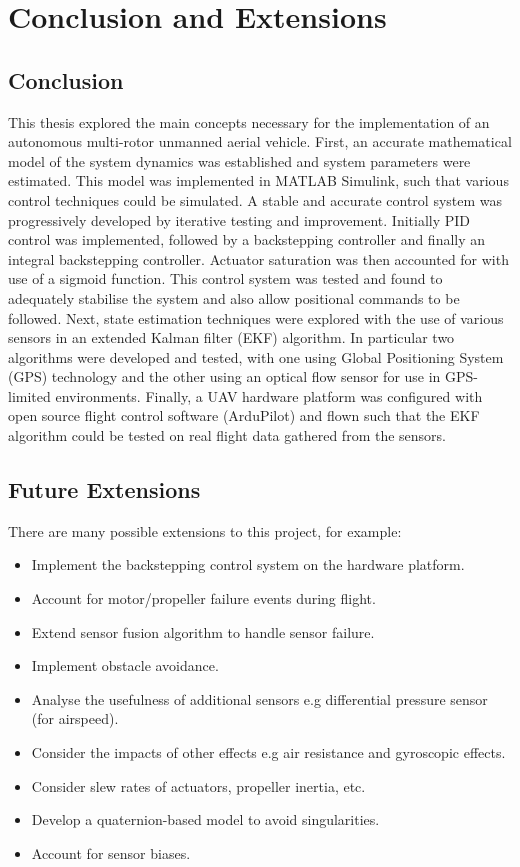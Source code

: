 
\chapter{Conclusion and Extensions}

\section{Conclusion}
This thesis explored the main concepts necessary for the implementation of an autonomous multi-rotor unmanned aerial vehicle. First, an accurate mathematical model of the system dynamics was established and system parameters were estimated. This model was implemented in MATLAB Simulink, such that various control techniques could be simulated. A stable and accurate control system was progressively developed by iterative testing and improvement. Initially PID control was implemented, followed by a backstepping controller and finally an integral backstepping controller. Actuator saturation was then accounted for with use of a sigmoid function. This control system was tested and found to adequately stabilise the system and also allow positional commands to be followed. Next, state estimation techniques were explored with the use of various sensors in an extended Kalman filter (EKF) algorithm. In particular two algorithms were developed and tested, with one using Global Positioning System (GPS) technology and the other using an optical flow sensor for use in GPS-limited environments. Finally, a UAV hardware platform was configured with open source flight control software (ArduPilot) and flown such that the EKF algorithm could be tested on real flight data gathered from the sensors.

\section{Future Extensions}
There are many possible extensions to this project, for example:

\begin{itemize}
\item Implement the backstepping control system on the hardware platform.
\item Account for motor/propeller failure events during flight.
\item Extend sensor fusion algorithm to handle sensor failure.
\item Implement obstacle avoidance.
\item Analyse the usefulness of additional sensors e.g differential pressure sensor (for airspeed).
\item Consider the impacts of other effects e.g air resistance and gyroscopic effects.
\item Consider slew rates of actuators, propeller inertia, etc.
\item Develop a quaternion-based model to avoid singularities.
\item Account for sensor biases.


\end{itemize}

\clearpage


